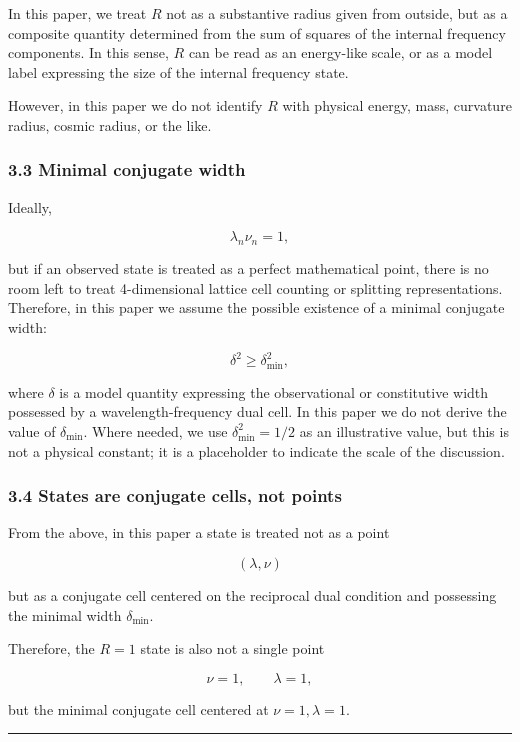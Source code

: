 \documentclass[
]{article}
\begin{document}
In this paper, we treat \(R\) not as a substantive radius given from
outside, but as a composite quantity determined from the sum of squares
of the internal frequency components. In this sense, \(R\) can be read
as an energy-like scale, or as a model label expressing the size of the
internal frequency state.

However, in this paper we do not identify \(R\) with physical energy,
mass, curvature radius, cosmic radius, or the like.

\subsubsection{3.3 Minimal conjugate
width}\label{minimal-conjugate-width}

Ideally,

\[
\lambda_n\nu_n=1,
\]

but if an observed state is treated as a perfect mathematical point,
there is no room left to treat 4-dimensional lattice cell counting or
splitting representations. Therefore, in this paper we assume the
possible existence of a minimal conjugate width:

\[
\delta^2\ge \delta_{\min}^2,
\]

where \(\delta\) is a model quantity expressing the observational or
constitutive width possessed by a wavelength-frequency dual cell. In
this paper we do not derive the value of \(\delta_{\min}\). Where
needed, we use \(\delta_{\min}^2=1/2\) as an illustrative value, but
this is not a physical constant; it is a placeholder to indicate the
scale of the discussion.

\subsubsection{3.4 States are conjugate cells, not
points}\label{states-are-conjugate-cells-not-points}

From the above, in this paper a state is treated not as a point

\[
(\lambda,\nu)
\]

but as a conjugate cell centered on the reciprocal dual condition and
possessing the minimal width \(\delta_{\min}\).

Therefore, the \(R=1\) state is also not a single point

\[
\nu=1,\qquad \lambda=1,
\]

but the minimal conjugate cell centered at \(\nu=1,\lambda=1\).

\begin{center}\rule{0.5\linewidth}{0.5pt}\end{center}
\end{document}
